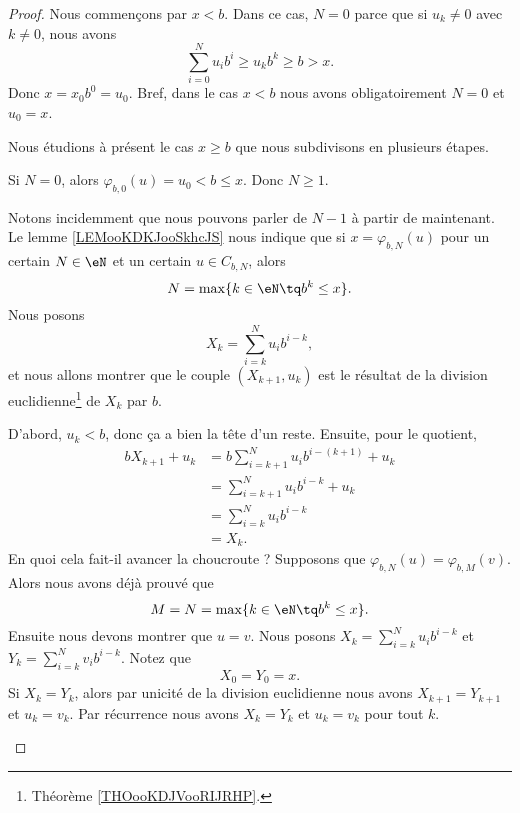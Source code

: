 \begin{proof}
	Nous commençons par \( x<b\). Dans ce cas, \( N=0\) parce que si \( u_k\neq 0\) avec \( k\neq 0\), nous avons
	\begin{equation}
		\sum_{i=0}^Nu_ib^i\geq u_kb^k\geq b>x.
	\end{equation}
	Donc \( x=x_0b^0=u_0\). Bref, dans le cas \( x<b\) nous avons obligatoirement \( N=0\) et \( u_0=x\).

	Nous étudions à présent le cas \( x\geq b\) que nous subdivisons en plusieurs étapes.
	\begin{subproof}
		\spitem[\( N\geq 1\)]
		Si \( N=0\), alors \( \varphi_{b,0}(u)=u_0<b\leq x\). Donc \( N\geq 1\).

		Notons incidemment que nous pouvons parler de \( N-1\) à partir de maintenant.
		Le lemme \ref{LEMooKDKJooSkhcJS} nous indique que si \( x=\varphi_{b,N}(u)\) pour un certain \( N\in \eN\) et un certain \( u\in C_{b,N}\), alors
		\begin{equation}
			N=\max\{ k\in \eN\tq b^k\leq x \}.
		\end{equation}
		Nous posons
		\begin{equation}
			X_k=\sum_{i=k}^Nu_ib^{i-k},
		\end{equation}
		et nous allons montrer que le couple \( (X_{k+1}, u_k)\) est le résultat de la division euclidienne\footnote{Théorème \ref{THOooKDJVooRIJRHP}.} de \( X_k\) par \(b\).

		D'abord, \( u_k<b\), donc ça a bien la tête d'un reste. Ensuite, pour le quotient,
		\begin{subequations}
			\begin{align}
				bX_{k+1}+u_k & =b\sum_{i=k+1}^Nu_ib^{i-(k+1)}+u_k \\
				             & =\sum_{i=k+1}^Nu_ib^{i-k}+u_k      \\
				             & =\sum_{i=k}^Nu_ib^{i-k}            \\
				             & =X_k.
			\end{align}
		\end{subequations}
		\spitem[Unicité]
		En quoi cela fait-il avancer la choucroute ? Supposons que \( \varphi_{b,N}(u)=\varphi_{b,M}(v)\). Alors nous avons déjà prouvé que
		\begin{equation}
			M=N=\max\{ k\in \eN\tq b^k\leq x \}.
		\end{equation}
		Ensuite nous devons montrer que \( u=v\). Nous posons \( X_k=\sum_{i=k}^Nu_ib^{i-k}\) et \( Y_k=\sum_{i=k}^Nv_ib^{i-k}\). Notez que
		\begin{equation}
			X_0=Y_0=x.
		\end{equation}
		Si \( X_k=Y_k\), alors par unicité de la division euclidienne nous avons \( X_{k+1}=Y_{k+1}\) et \( u_k=v_k\). Par récurrence nous avons \( X_k=Y_k\) et \( u_k=v_k\) pour tout \( k\).


\end{subproof}
\end{proof}
